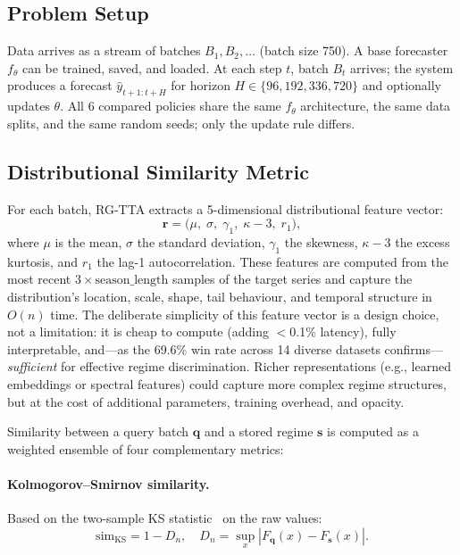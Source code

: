 \documentclass[journal]{IEEEtran}
\begin{document}
\subsection{Problem Setup}

Data arrives as a stream of batches $B_1, B_2, \ldots$ (batch size 750). A base forecaster $f_\theta$ can be trained, saved, and loaded. At each step $t$, batch $B_t$ arrives; the system produces a forecast $\hat{y}_{t+1:t+H}$ for horizon $H \in \{96, 192, 336, 720\}$ and optionally updates $\theta$. All 6 compared policies share the same $f_\theta$ architecture, the same data splits, and the same random seeds; only the update rule differs.

\subsection{Distributional Similarity Metric}
\label{sec:similarity}

For each batch, RG-TTA extracts a 5-dimensional distributional feature vector:
\begin{equation}
  \mathbf{r} = \big(\mu,\; \sigma,\; \gamma_1,\; \kappa{-}3,\; r_1\big),
  \label{eq:features}
\end{equation}
where $\mu$ is the mean, $\sigma$ the standard deviation, $\gamma_1$ the skewness, $\kappa{-}3$ the excess kurtosis, and $r_1$ the lag-1 autocorrelation. These features are computed from the most recent $3 \times \text{season\_length}$ samples of the target series and capture the distribution's location, scale, shape, tail behaviour, and temporal structure in $O(n)$ time. The deliberate simplicity of this feature vector is a design choice, not a limitation: it is cheap to compute (adding $<$0.1\% latency), fully interpretable, and---as the 69.6\% win rate across 14 diverse datasets confirms---\emph{sufficient} for effective regime discrimination. Richer representations (e.g., learned embeddings or spectral features) could capture more complex regime structures, but at the cost of additional parameters, training overhead, and opacity.

Similarity between a query batch $\mathbf{q}$ and a stored regime $\mathbf{s}$ is computed as a weighted ensemble of four complementary metrics:

\paragraph{Kolmogorov--Smirnov similarity.} Based on the two-sample KS statistic~\cite{massey1951ks} on the raw values:
\begin{equation}
  \text{sim}_{\text{KS}} = 1 - D_n, \quad D_n = \sup_x |F_{\mathbf{q}}(x) - F_{\mathbf{s}}(x)|.
\end{equation}
\end{document}
